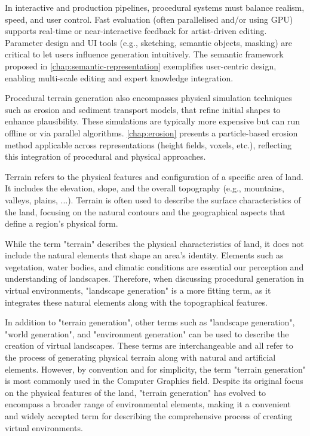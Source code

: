 In interactive and production pipelines, procedural systems must balance realism, speed, and user control. Fast evaluation (often parallelised and/or using GPU) supports real-time or near-interactive feedback for artist-driven editing. Parameter design and UI tools (e.g., sketching, semantic objects, masking) are critical to let users influence generation intuitively. The semantic  framework proposed in \cref{chap:semantic-representation} exemplifies user-centric design, enabling multi-scale editing and expert knowledge integration.

Procedural terrain generation also encompasses physical simulation techniques such as erosion and sediment transport models, that refine initial shapes to enhance plausibility. These simulations are typically more expensive but can run offline or via parallel algorithms. \cref{chap:erosion} presents a particle-based erosion method applicable across representations (height fields, voxels, etc.), reflecting this integration of procedural and physical approaches.


Terrain refers to the physical features and configuration of a specific area of land. It includes the elevation, slope, and the overall topography (e.g., mountains, valleys, plains, ...). Terrain is often used to describe the surface characteristics of the land, focusing on the natural contours and the geographical aspects that define a region's physical form.

    While the term "terrain" describes the physical characteristics of land, it does not include the natural elements that shape an area's identity. Elements such as vegetation, water bodies, and climatic conditions are essential our perception and understanding of landscapes. Therefore, when discussing procedural generation in virtual environments, "landscape generation" is a more fitting term, as it integrates these natural elements along with the topographical features.

    In addition to "terrain generation", other terms such as "landscape generation", "world generation", and "environment generation" can be used to describe the creation of virtual landscapes. These terms are interchangeable and all refer to the process of generating physical terrain along with natural and artificial elements. However, by convention and for simplicity, the term "terrain generation" is most commonly used in the Computer Graphics field. Despite its original focus on the physical features of the land, "terrain generation" has evolved to encompass a broader range of environmental elements, making it a convenient and widely accepted term for describing the comprehensive process of creating virtual environments.

